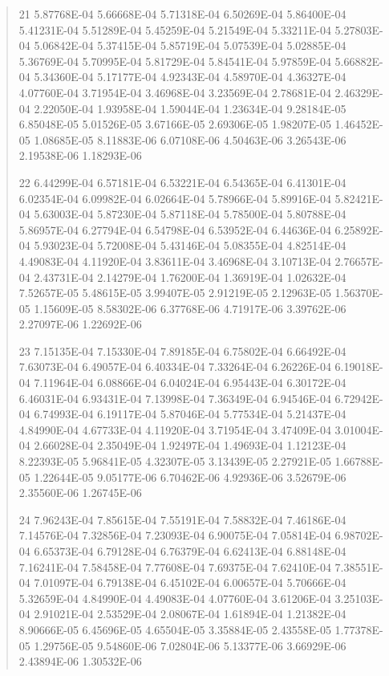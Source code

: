 \documentclass[letterpaper,10pt,english]{sphinxmanual}
\begin{document}
\begin{quote}
\begin{DUlineblock}{0em}
\item[] 21   5.87768E-04  5.66668E-04  5.71318E-04  6.50269E-04  5.86400E-04  5.41231E-04  5.51289E-04  5.45259E-04  5.21549E-04  5.33211E-04  5.27803E-04  5.06842E-04  5.37415E-04  5.85719E-04  5.07539E-04  5.02885E-04  5.36769E-04  5.70995E-04  5.81729E-04  5.84541E-04  5.97859E-04  5.66882E-04  5.34360E-04  5.17177E-04  4.92343E-04  4.58970E-04  4.36327E-04  4.07760E-04  3.71954E-04  3.46968E-04  3.23569E-04  2.78681E-04  2.46329E-04  2.22050E-04  1.93958E-04  1.59044E-04  1.23634E-04  9.28184E-05  6.85048E-05  5.01526E-05  3.67166E-05  2.69306E-05  1.98207E-05  1.46452E-05  1.08685E-05  8.11883E-06  6.07108E-06  4.50463E-06  3.26543E-06  2.19538E-06  1.18293E-06
\item[] 22   6.44299E-04  6.57181E-04  6.53221E-04  6.54365E-04  6.41301E-04  6.02354E-04  6.09982E-04  6.02664E-04  5.78966E-04  5.89916E-04  5.82421E-04  5.63003E-04  5.87230E-04  5.87118E-04  5.78500E-04  5.80788E-04  5.86957E-04  6.27794E-04  6.54798E-04  6.53952E-04  6.44636E-04  6.25892E-04  5.93023E-04  5.72008E-04  5.43146E-04  5.08355E-04  4.82514E-04  4.49083E-04  4.11920E-04  3.83611E-04  3.46968E-04  3.10713E-04  2.76657E-04  2.43731E-04  2.14279E-04  1.76200E-04  1.36919E-04  1.02632E-04  7.52657E-05  5.48615E-05  3.99407E-05  2.91219E-05  2.12963E-05  1.56370E-05  1.15609E-05  8.58302E-06  6.37768E-06  4.71917E-06  3.39762E-06  2.27097E-06  1.22692E-06
\item[] 23   7.15135E-04  7.15330E-04  7.89185E-04  6.75802E-04  6.66492E-04  7.63073E-04  6.49057E-04  6.40334E-04  7.33264E-04  6.26226E-04  6.19018E-04  7.11964E-04  6.08866E-04  6.04024E-04  6.95443E-04  6.30172E-04  6.46031E-04  6.93431E-04  7.13998E-04  7.36349E-04  6.94546E-04  6.72942E-04  6.74993E-04  6.19117E-04  5.87046E-04  5.77534E-04  5.21437E-04  4.84990E-04  4.67733E-04  4.11920E-04  3.71954E-04  3.47409E-04  3.01004E-04  2.66028E-04  2.35049E-04  1.92497E-04  1.49693E-04  1.12123E-04  8.22393E-05  5.96841E-05  4.32307E-05  3.13439E-05  2.27921E-05  1.66788E-05  1.22644E-05  9.05177E-06  6.70462E-06  4.92936E-06  3.52679E-06  2.35560E-06  1.26745E-06
\item[] 24   7.96243E-04  7.85615E-04  7.55191E-04  7.58832E-04  7.46186E-04  7.14576E-04  7.32856E-04  7.23093E-04  6.90075E-04  7.05814E-04  6.98702E-04  6.65373E-04  6.79128E-04  6.76379E-04  6.62413E-04  6.88148E-04  7.16241E-04  7.58458E-04  7.77608E-04  7.69375E-04  7.62410E-04  7.38551E-04  7.01097E-04  6.79138E-04  6.45102E-04  6.00657E-04  5.70666E-04  5.32659E-04  4.84990E-04  4.49083E-04  4.07760E-04  3.61206E-04  3.25103E-04  2.91021E-04  2.53529E-04  2.08067E-04  1.61894E-04  1.21382E-04  8.90666E-05  6.45696E-05  4.65504E-05  3.35884E-05  2.43558E-05  1.77378E-05  1.29756E-05  9.54860E-06  7.02804E-06  5.13377E-06  3.66929E-06  2.43894E-06  1.30532E-06

\end{DUlineblock}
\end{quote}
\end{document}

